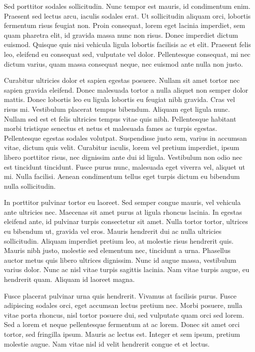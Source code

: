 \documentclass[a4paper]{article}
\begin{document}
Sed porttitor sodales sollicitudin. Nunc tempor est mauris, id condimentum enim. Praesent sed lectus arcu, iaculis sodales erat. Ut sollicitudin aliquam orci, lobortis fermentum risus feugiat non. Proin consequat, lorem eget lacinia imperdiet, sem quam pharetra elit, id gravida massa nunc non risus. Donec imperdiet dictum euismod. Quisque quis nisi vehicula ligula lobortis facilisis ac et elit. Praesent felis leo, eleifend eu consequat sed, vulputate vel dolor. Pellentesque consequat, mi nec dictum varius, quam massa consequat neque, nec euismod ante nulla non justo.

Curabitur ultricies dolor et sapien egestas posuere. Nullam sit amet tortor nec sapien gravida eleifend. Donec malesuada tortor a nulla aliquet non semper dolor mattis. Donec lobortis leo eu ligula lobortis eu feugiat nibh gravida. Cras vel risus mi. Vestibulum placerat tempus bibendum. Aliquam eget ligula nunc. Nullam sed est et felis ultricies tempus vitae quis nibh. Pellentesque habitant morbi tristique senectus et netus et malesuada fames ac turpis egestas. Pellentesque egestas sodales volutpat. Suspendisse justo sem, varius in accumsan vitae, dictum quis velit. Curabitur iaculis, lorem vel pretium imperdiet, ipsum libero porttitor risus, nec dignissim ante dui id ligula. Vestibulum non odio nec est tincidunt tincidunt. Fusce purus nunc, malesuada eget viverra vel, aliquet ut mi. Nulla facilisi. Aenean condimentum tellus eget turpis dictum eu bibendum nulla sollicitudin.

In porttitor pulvinar tortor eu laoreet. Sed semper congue mauris, vel vehicula ante ultricies nec. Maecenas sit amet purus at ligula rhoncus lacinia. In egestas eleifend ante, id pulvinar turpis consectetur sit amet. Nulla tortor tortor, ultrices eu bibendum ut, gravida vel eros. Mauris hendrerit dui ac nulla ultricies sollicitudin. Aliquam imperdiet pretium leo, at molestie risus hendrerit quis. Mauris nibh justo, molestie sed elementum nec, tincidunt a urna. Phasellus auctor metus quis libero ultrices dignissim. Nunc id augue massa, vestibulum varius dolor. Nunc ac nisl vitae turpis sagittis lacinia. Nam vitae turpis augue, eu hendrerit quam. Aliquam id laoreet magna.

Fusce placerat pulvinar urna quis hendrerit. Vivamus at facilisis purus. Fusce adipiscing sodales orci, eget accumsan lectus pretium nec. Morbi posuere, nulla vitae porta rhoncus, nisl tortor posuere dui, sed vulputate quam orci sed lorem. Sed a lorem et neque pellentesque fermentum at ac lorem. Donec sit amet orci tortor, sed fringilla ipsum. Mauris ac lectus est. Integer et sem ipsum, pretium molestie augue. Nam vitae nisl id velit hendrerit congue et et lectus.
\end{document}
